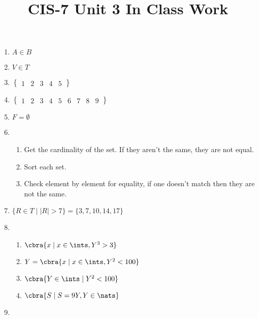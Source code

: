 \documentclass{article}
\title{CIS-7 Unit 3 In Class Work}
\begin{document}
\maketitle
\pagebreak

\begin{enumerate}
	\item $A\in B$
	\item $V\in T$
	\item $\begin{Bmatrix}
			1 & 2 & 3 & 4 & 5
		\end{Bmatrix}$
	\item $\begin{Bmatrix}
			1 & 2 & 3 & 4 & 5 & 6 & 7 & 8 & 9
		\end{Bmatrix}$
	\item $F = \emptyset $
	\item 
		\begin{enumerate}
			\item Get the cardinality of the set. If they aren't the same, they are not equal.
			\item Sort each set.
			\item Check element by element for equality, if one doesn't match then they are not the same.
		\end{enumerate}

	\item $
		\{R \in T \mid |R| > 7\} = \{3, 7, 10, 14, 17\}
		$

	\item 
		\begin{enumerate}
			\item $\cbra{x \mid x \in  \ints, Y^{3}>3}$
			\item $Y=\cbra{x \mid x \in \ints, Y^{2}<100}$ 
			\item $\cbra{Y \in \ints \mid Y^{2} < 100}$ 
			\item $\cbra{S \mid S = 9Y, Y \in \nats}$
		\end{enumerate}

	\item {}
\end{enumerate}
\end{document}
